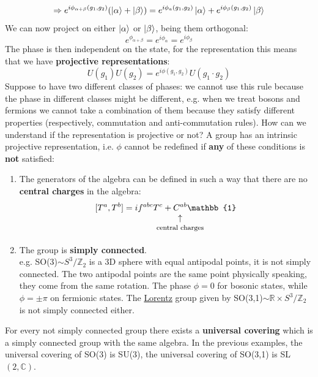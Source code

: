 \documentclass[../main.tex]{subfiles}
\begin{document}
\[
\Rightarrow e^{i\phi_{\alpha+\beta}(g_1,g_2)}(\ket{\alpha}+\ket{\beta})=e^{i\phi_a(g_1,g_2)}\ket{\alpha}+e^{i\phi_\beta(g_1,g_2)}\ket{\beta}
\]
We can now project on either $\ket{\alpha}$ or $\ket{\beta}$, being them orthogonal: 
\[
e^{\phi_{\alpha+\beta}}=e^{i\phi_\alpha}=e^{i\phi_\beta}
\]
The phase is then independent on the state, for the representation this means that we have \textbf{projective representations}:
\[
U(g_1)U(g_2)=e^{i\phi(g_1,g_2)}U(g_1\cdot g_2)
\]
Suppose to have two different classes of phases: we cannot use this rule because the phase in different classes might be different, e.g. when we treat bosons and fermions we cannot take a combination of them because they satisfy different properties (respectively, commutation and anti-commutation rules). How can we understand if the representation is projective or not? A group has an intrinsic projective representation, i.e. $\phi$ cannot be redefined if \textbf{any} of these conditions is \textbf{not} satisfied:
\begin{enumerate}
    \item The generators of the algebra can be defined in such a way that there are no \textbf{central charges} in the algebra:
    \[
    [T^a,T^b]=if^{abc}T^c+\underset{\mathclap{\tikz \node {$\uparrow$} node [below=1ex] {\footnotesize central charges };}}{C^{ab}}\mathbb{1}
    \]
    \item The group is \textbf{simply connected}.\\
    e.g. SO(3)$\sim S^3/\mathbb{Z}_2$ is a 3D sphere with equal antipodal points, it is not simply connected. The two antipodal points are the same point physically speaking, they come from the same rotation. The phase $\phi=0$ for bosonic states, while $\phi=\pm\pi$ on fermionic states. The \href{https://en.wikipedia.org/wiki/Hendrik_Lorentz}{Lorentz} group given by SO(3,1)$\sim\mathbb{R}\times S^3/\mathbb{Z}_2$ is not simply connected either.
\end{enumerate}
For every not simply connected group there exists a \textbf{universal covering} which is a simply connected group with the same algebra. In the previous examples, the universal covering of SO(3) is SU(3), the universal covering of SO(3,1) is SL$(2,\mathbb{C})$.
\end{document}
